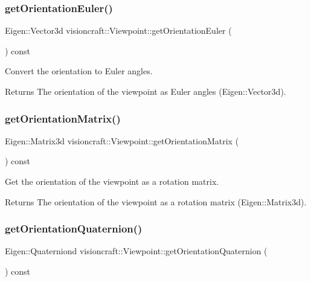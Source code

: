 \subsubsection{\texorpdfstring{get\+Orientation\+Euler()}{getOrientationEuler()}}
{\footnotesize\ttfamily Eigen\+::\+Vector3d visioncraft\+::\+Viewpoint\+::get\+Orientation\+Euler (\begin{DoxyParamCaption}{ }\end{DoxyParamCaption}) const}



Convert the orientation to Euler angles. 

\begin{DoxyReturn}{Returns}
The orientation of the viewpoint as Euler angles (Eigen\+::\+Vector3d). 
\end{DoxyReturn}
\mbox{\label{classvisioncraft_1_1Viewpoint_a160da053602ad2033650b07d995da95a}} 
\subsubsection{\texorpdfstring{get\+Orientation\+Matrix()}{getOrientationMatrix()}}
{\footnotesize\ttfamily Eigen\+::\+Matrix3d visioncraft\+::\+Viewpoint\+::get\+Orientation\+Matrix (\begin{DoxyParamCaption}{ }\end{DoxyParamCaption}) const}



Get the orientation of the viewpoint as a rotation matrix. 

\begin{DoxyReturn}{Returns}
The orientation of the viewpoint as a rotation matrix (Eigen\+::\+Matrix3d). 
\end{DoxyReturn}
\mbox{\label{classvisioncraft_1_1Viewpoint_a9d594ba3c04f61b1998d1af990960648}} 
\subsubsection{\texorpdfstring{get\+Orientation\+Quaternion()}{getOrientationQuaternion()}}
{\footnotesize\ttfamily Eigen\+::\+Quaterniond visioncraft\+::\+Viewpoint\+::get\+Orientation\+Quaternion (\begin{DoxyParamCaption}{ }\end{DoxyParamCaption}) const}



